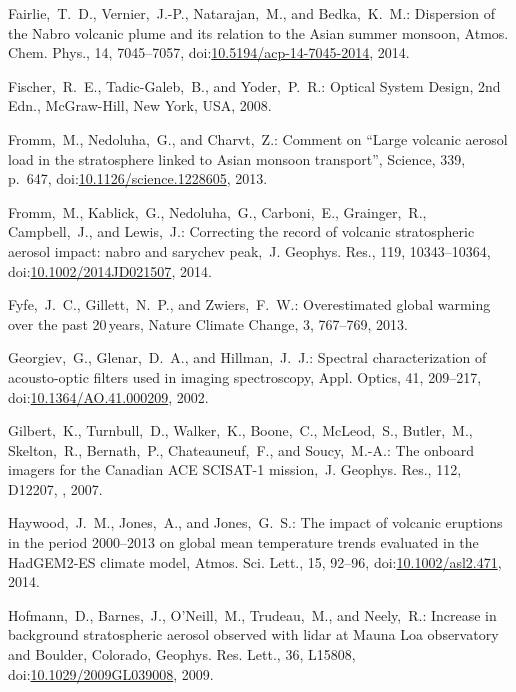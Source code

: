 \documentclass[amtd, online, hvmath]{copernicus}
\begin{document}
\begin{thebibliography}{99}
Fairlie,~T.~D., Vernier,~J.-P., Natarajan,~M., and Bedka,~K.~M.: Dispersion
of the Nabro volcanic plume and its relation to the Asian summer monsoon,
Atmos. Chem. Phys., 14, 7045--7057,
doi:\href{http://dx.doi.org/10.5194/acp-14-7045-2014}{10.5194/acp-14-7045-2014},
2014.



Fischer,~R.~E., Tadic-Galeb,~B., and Yoder,~P.~R.: Optical System Design, 2nd
Edn., McGraw-Hill, New York, USA, 2008.


Fromm,~M., Nedoluha,~G., and Charvt,~Z.: Comment on ``Large volcanic aerosol
load in the stratosphere linked to Asian monsoon transport'', Science, 339,
p.~647,
doi:\href{http://dx.doi.org/10.1126/science.1228605}{10.1126/science.1228605},
2013.


Fromm,~M., Kablick,~G., Nedoluha,~G., Carboni,~E., Grainger,~R.,
Campbell,~J., and Lewis,~J.: Correcting the record of volcanic stratospheric
aerosol impact: nabro and sarychev peak,~J. Geophys. Res., 119, 10343--10364,
doi:\href{http://dx.doi.org/10.1002/2014JD021507}{10.1002/2014JD021507},
2014.


Fyfe,~J.~C., Gillett,~N.~P., and Zwiers,~F.~W.: Overestimated global warming
over the past 20\,\unit{years}, Nature Climate Change, 3, 767--769, 2013.


Georgiev,~G., Glenar,~D.~A., and Hillman,~J.~J.: Spectral characterization of
acousto-optic filters used in imaging spectroscopy, Appl. Optics, 41,
209--217,
doi:\href{http://dx.doi.org/10.1364/AO.41.000209}{10.1364/AO.41.000209},
2002.


Gilbert,~K., Turnbull,~D., Walker,~K., Boone,~C., McLeod,~S., Butler,~M.,
Skelton,~R., Bernath,~P., Chateauneuf,~F., and Soucy,~M.-A.: The onboard
imagers for the Canadian ACE SCISAT-1 mission,~J. Geophys. Res., 112, D12207,
, 2007.


Haywood,~J.~M., Jones,~A., and Jones,~G.~S.: The impact of volcanic eruptions
in the period 2000--2013 on global mean temperature trends evaluated in the
HadGEM2-ES climate model, Atmos. Sci. Lett., 15, 92--96,
doi:\href{http://dx.doi.org/10.1002/asl2.471}{10.1002/asl2.471}, 2014.


Hofmann,~D., Barnes,~J., O'Neill,~M., Trudeau,~M., and Neely,~R.: Increase in
background stratospheric aerosol observed with lidar at Mauna Loa observatory
and Boulder, Colorado, Geophys. Res. Lett., 36, L15808,
doi:\href{http://dx.doi.org/10.1029/2009GL039008}{10.1029/2009GL039008},
2009.



\end{thebibliography}
\end{document}
